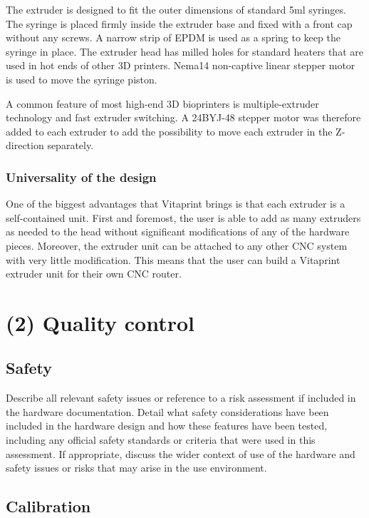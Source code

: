 \documentclass[a4paper]{article}
\begin{document}
The extruder is designed to fit the outer dimensions of standard 5ml syringes. The syringe is placed firmly inside the extruder base and fixed with a front cap without any screws. A narrow strip of EPDM is used as a spring to keep the syringe in place. The extruder head has milled holes for standard heaters that are used in hot ends of other 3D printers. Nema14 non-captive linear stepper motor is used to move the syringe piston.

A common feature of most high-end 3D bioprinters is multiple-extruder technology and fast extruder switching. A 24BYJ-48 stepper motor was therefore added to each extruder to add the possibility to move each extruder in the Z-direction separately.


\subsubsection{Universality of the design}\label{h.q32f2nclh4e5}

One of the biggest advantages that Vitaprint brings is that each extruder is a self-contained unit. First and foremost, the user is able to add as many extruders as needed to the head without significant modifications of any of the hardware pieces. Moreover, the extruder unit can be attached to any other CNC system with very little modification. This means that the user can build a Vitaprint extruder unit for their own CNC router.


\section{(2) Quality control}\label{h.f8237gmzmwc6}

\subsection{Safety}\label{h.v60aduckfisj}

Describe all relevant safety issues or reference to a risk assessment
if included in the hardware documentation. Detail what safety
considerations have been included in the hardware design and how these
features have been tested, including any official safety standards or
criteria that were used in this assessment. If appropriate, discuss the
wider context of use of the hardware and safety issues or risks that may
arise in the use environment.


\subsection{Calibration}\label{h.kr90wh14sxr5}
\end{document}
